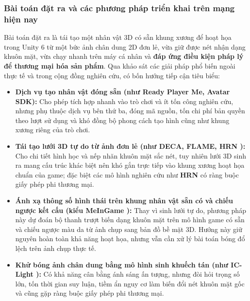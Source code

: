 \subsubsection{Bài toán đặt ra và các phương pháp triển khai trên mạng hiện nay}
Bài toán đặt ra là tái tạo một nhân vật 3D có sẵn khung xương để hoạt họa trong Unity 6 từ một bức ảnh chân dung 2D đơn lẻ, vừa giữ được nét nhận dạng khuôn mặt, vừa chạy nhanh trên máy cá nhân và \textbf{đáp ứng điều kiện pháp lý để thương mại hóa sản phẩm}. Qua khảo sát các giải pháp phổ biến ngoài thực tế và trong cộng đồng nghiên cứu, có bốn hướng tiếp cận tiêu biểu:
\begin{itemize}
    \item \textbf{Dịch vụ tạo nhân vật đóng sẵn (như Ready Player Me, Avatar SDK):} Cho phép tích hợp nhanh vào trò chơi và ít tốn công nghiên cứu, nhưng phụ thuộc dịch vụ bên thứ ba, đóng mã nguồn, tốn chi phí bản quyền theo lượt sử dụng và khó đồng bộ phong cách tạo hình cũng như khung xương riêng của trò chơi.
    \item \textbf{Tái tạo lưới 3D tự do từ ảnh đơn lẻ (như DECA, FLAME, HRN \cite{hrn}):} Cho chi tiết hình học và nếp nhăn khuôn mặt sắc nét, tuy nhiên lưới 3D sinh ra mang cấu trúc khác biệt nên khó gắn trực tiếp vào khung xương hoạt họa chuẩn của game; đặc biệt các mô hình nghiên cứu như \textbf{HRN} có ràng buộc giấy phép phi thương mại.
    \item \textbf{Ánh xạ thông số hình thái trên khung nhân vật sẵn có và chiếu ngược kết cấu (kiểu MeInGame \cite{meingame}):} Thay vì sinh lưới tự do, phương pháp này dự đoán bộ thanh trượt biến dạng khuôn mặt trên mô hình game có sẵn và chiếu ngược màu da từ ảnh chụp sang bản đồ bề mặt 3D. Hướng này giữ nguyên hoàn toàn khả năng hoạt họa, nhưng vẫn cần xử lý bài toán bóng đổ lệch trên ảnh chụp thực tế.
    \item \textbf{Khử bóng ảnh chân dung bằng mô hình sinh khuếch tán (như IC-Light \cite{iclight}):} Có khả năng cân bằng ánh sáng ấn tượng, nhưng đòi hỏi trọng số lớn, tốn thời gian suy luận, tiềm ẩn nguy cơ làm biến đổi nét khuôn mặt gốc và cũng gặp ràng buộc giấy phép phi thương mại.
\end{itemize}

